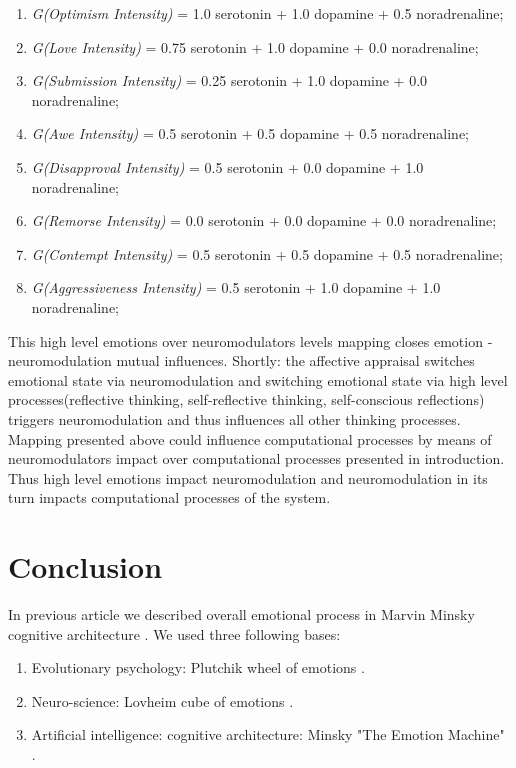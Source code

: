 \begin{enumerate}
	\item  \emph{G(Optimism Intensity)} = 1.0 serotonin  + 1.0 dopamine + 0.5 noradrenaline;
	\item  \emph{G(Love Intensity)} = 0.75 serotonin + 1.0 dopamine + 0.0 noradrenaline;
	\item  \emph{G(Submission Intensity)} = 0.25 serotonin + 1.0 dopamine + 0.0 noradrenaline;
	\item  \emph{G(Awe Intensity)} = 0.5 serotonin + 0.5 dopamine + 0.5 noradrenaline;
	\item  \emph{G(Disapproval Intensity)} = 0.5 serotonin + 0.0 dopamine + 1.0 noradrenaline;
	\item  \emph{G(Remorse Intensity)} = 0.0 serotonin + 0.0 dopamine + 0.0 noradrenaline;
	\item  \emph{G(Contempt Intensity)} = 0.5 serotonin + 0.5 dopamine + 0.5 noradrenaline;
	\item  \emph{G(Aggressiveness Intensity)} = 0.5 serotonin + 1.0 dopamine + 1.0 noradrenaline;
\end{enumerate}

This high level emotions over neuromodulators levels mapping closes emotion - neuromodulation mutual influences. Shortly: the affective appraisal switches emotional state via neuromodulation and switching emotional state via high level processes(reflective thinking, self-reflective thinking, self-conscious reflections) triggers neuromodulation and thus influences all other thinking processes. Mapping presented above could influence computational processes by means of neuromodulators impact over computational processes presented in introduction. Thus high level emotions impact neuromodulation and neuromodulation in its turn impacts computational processes of the system.

\section{Conclusion}

In previous article \cite{computational_emotional_thinking} we described overall emotional process in Marvin Minsky cognitive architecture \cite{emotionmachine}. We used three following bases:

\begin{enumerate}
	\item Evolutionary psychology: Plutchik wheel of emotions \cite{natureofemotions}.
	\item Neuro-science: Lovheim cube of emotions \cite{cubeofemotions}.
	\item Artificial intelligence: cognitive architecture: Minsky "The Emotion Machine" \cite{emotionmachine}.
\end{enumerate}


